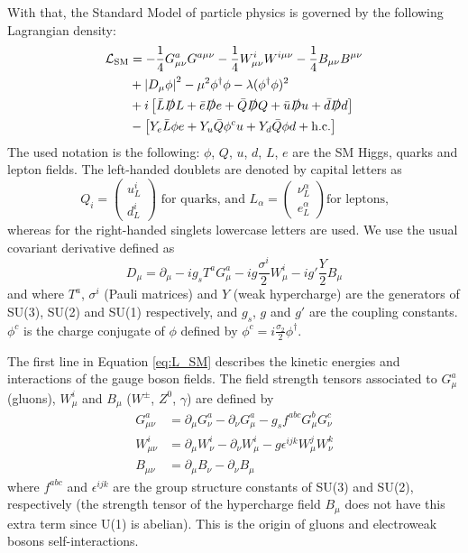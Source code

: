 With that, the Standard Model of particle physics is governed by the following Lagrangian density:
\begin{equation}
\begin{aligned}
    \mathcal{L}_{\text{SM}} &= -\frac{1}{4}G_{\mu\nu}^{a}G^{a\mu\nu} -\frac{1}{4}W_{\mu\nu}^{i}W^{i\mu\nu} -\frac{1}{4}B_{\mu\nu}B^{\mu\nu} \label{eq:L_SM}\\
    &+ \left\lvert D_\mu\phi\right\rvert^2 - \mu^2\phi^\dag\phi - \lambda(\phi^\dag\phi)^2 \\
    &+ i\left[\bar{L}\slashed{D} L + \bar{e}\slashed{D} e + \bar{Q}\slashed{D} Q + \bar{u}\slashed{D} u + \bar{d}\slashed{D} d\right] \\
    & -\left[Y_{e}\bar{L}\phi e + Y_u\bar{Q}\phi^{c} u + Y_d\bar{Q}\phi d + \text{h.c.}\right]
\end{aligned}
\end{equation}
The used notation is the following: $\phi$, $Q$, $u$, $d$, $L$, $e$ are the SM Higgs, quarks and lepton fields. The left-handed doublets are denoted by capital letters as
\begin{equation*}
    Q_{i} = 
    \begin{pmatrix}
    u_{L}^{i}\\
    d_{L}^{i}
    \end{pmatrix}
    \text{ for quarks, and } L_{\alpha} = 
    \begin{pmatrix}
    \nu_{L}^{\alpha}\\
    e_{L}^{\alpha}
    \end{pmatrix}\text{for leptons,}
\end{equation*}
whereas for the right-handed singlets lowercase letters are used. We use the usual covariant derivative defined as
\begin{equation*}
    D_\mu = \partial_\mu - ig_{s}T^{a}G_\mu^{a} - ig\frac{\sigma^{i}}{2}W_\mu^{i} - ig'\frac{Y}{2}B_\mu
\end{equation*}
and where $T^{a}$, $\sigma^{i}$ (Pauli matrices) and $Y$ (weak hypercharge) are the generators of SU(3), SU(2) and SU(1) respectively, and $g_s$, $g$ and $g'$ are the coupling constants. $\phi^{c}$ is the charge conjugate of $\phi$ defined by $\phi^{c} = i\frac{\sigma_{2}}{2}\phi^{\dag}$.

The first line in Equation \eqref{eq:L_SM} describes the kinetic energies and interactions of the gauge boson fields. The field strength tensors associated to $G_\mu^{a}$ (gluons), $W_\mu^{i}$ and $B_\mu$ ($W^{\pm}$, $Z^{0}$, $\gamma$) are defined by
\begin{align*}
    G_{\mu\nu}^{a} &= \partial_\mu G_\nu^{a} - \partial_\nu G_\mu^{a} - g_{s} f^{abc}G_\mu^{b}G_\nu^{c}\\
    W_{\mu\nu}^{i} &= \partial_\mu W_\nu^{i} - \partial_\nu W_\mu^{i} - g \epsilon^{ijk}W_\mu^{j}W_\nu^{k}\\
    B_{\mu\nu} &= \partial_\mu B_\nu - \partial_\nu B_\mu
\end{align*}
where $f^{abc}$ and $\epsilon^{ijk}$ are the group structure constants of SU(3) and SU(2), respectively (the strength tensor of the hypercharge field $B_\mu$ does not have this extra term since U(1) is abelian). This is the origin of gluons and electroweak bosons self-interactions.

